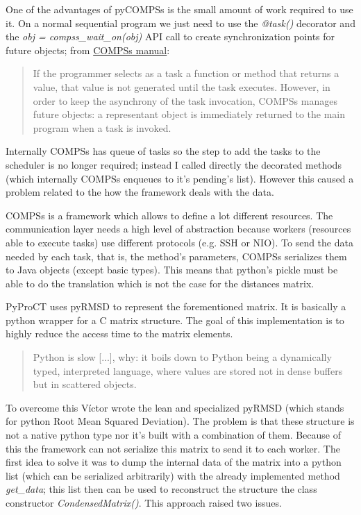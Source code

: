 One of the advantages of pyCOMPSs is the small amount of work required to use it. On a normal sequential program we just need to use the \textit{@task()} decorator and the \textit{obj = compss\_wait\_on(obj)} API call to create synchronization points for future objects; from \hyperref[sec:docs]{COMPSs manual}: 

\begin{quote} 
If the programmer selects as a task a function or method that returns a value, that value is not generated until the task executes. However, in order to keep the asynchrony of the task invocation, COMPSs manages future objects: a representant object is immediately returned to the main program when a task is invoked.
\end{quote}

Internally COMPSs has queue of tasks so the step to add the tasks to the scheduler is no longer required; instead I called directly the decorated methods (which internally COMPSs enqueues to it's pending's list). However this caused a problem related to the how the framework deals with the data.

COMPSs is a framework which allows to define a lot different resources. The communication layer needs a high level of abstraction because workers (resources able to execute tasks) use different protocols (e.g. SSH or NIO). To send the data needed by each task, that is, the method's parameters, COMPSs serializes them to Java objects (except basic types). This means that python's pickle must be able to do the translation which is not the case for the distances matrix.

PyProCT uses pyRMSD to represent the forementioned matrix. It is basically a python wrapper for a C matrix structure. The goal of this implementation is to highly reduce the access time to the matrix elements. 
\begin{quote}
Python is slow [...], why: it boils down to Python being a dynamically typed, interpreted language, where values are stored not in dense buffers but in scattered objects. \cite{vanderplas_why_2014}
\end{quote}

To overcome this Víctor wrote the lean and specialized pyRMSD (which stands for python Root Mean Squared Deviation). The problem is that these structure is not a native python type nor it's built with a combination of them. Because of this the framework can not serialize this matrix to send it to each worker. The first idea to solve it was to dump the internal data of the matrix into a python list (which can be serialized arbitrarily) with the already implemented method \textit{get\_data}; this list then can be used to reconstruct the structure the class constructor \textit{CondensedMatrix()}. This approach raised two issues. 

